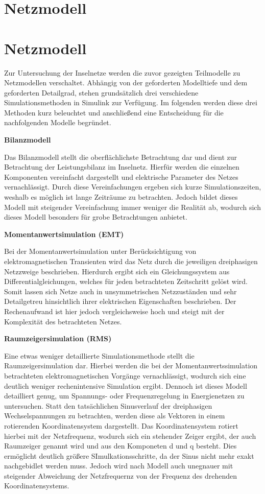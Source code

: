 \section{Netzmodell}
\section{Netzmodell}

Zur Untersuchung der Inselnetze werden die zuvor gezeigten Teilmodelle zu Netzmodellen verschaltet. Abhängig von der geforderten Modelltiefe und dem geforderten Detailgrad, stehen grundsätzlich drei verschiedene Simulationsmethoden in Simulink zur Verfügung. Im folgenden werden diese drei Methoden kurz beleuchtet und anschließend eine Entscheidung für die nachfolgenden Modelle begründet.

\textbf{Bilanzmodell}

Das Bilanzmodell stellt die oberflächlichste Betrachtung dar und dient zur Betrachtung der Leistungsbilanz im Inselnetz. Hierfür werden die einzelnen Komponenten vereinfacht dargestellt und elektrische Parameter des Netzes vernachlässigt. Durch diese Vereinfachungen ergeben sich kurze Simulationszeiten, weshalb es möglich ist lange Zeiträume zu betrachten. Jedoch bildet dieses Modell mit steigender Vereinfachung immer weniger die Realität ab, wodurch sich dieses Modell besonders für grobe Betrachtungen anbietet.

\textbf{Momentanwertsimulation (EMT)}

Bei der Momentanwertsimulation unter Berücksichtigung von elektromagnetischen Transienten wird das Netz durch die jeweiligen dreiphasigen Netzzweige beschrieben. Hierdurch ergibt sich ein Gleichungssystem aus Differentialgleichungen, welches für jeden betrachteten Zeitschritt gelöst wird. Somit lassen sich Netze auch in unsymmetrischen Netzzuständen und sehr Detailgetreu hinsichtlich ihrer elektrischen Eigenschaften beschrieben. Der Rechenaufwand ist hier jedoch vergleichsweise hoch und steigt mit der Komplexität des betrachteten Netzes. \cite{Simulationsmethoden}

\textbf{Raumzeigersimulation (RMS)}

Eine etwas weniger detaillierte Simulationsmethode stellt die Raumzeigersimulation dar. Hierbei werden die bei der Momentanwertssimulation betrachteten elektromagnetischen Vorgänge vernachlässigt, wodurch sich eine deutlich weniger rechenintensive Simulation ergibt. Dennoch ist dieses Modell detailliert genug, um Spannungs- oder Frequenzregelung in Energienetzen zu untersuchen. Statt den tatsächlichen Sinusverlauf der dreiphasigen Wechselspannungen zu betrachten, werden diese als Vektoren in einem rotierenden Koordinatensystem dargestellt. Das Koordinatensystem rotiert hierbei mit der Netzfrequenz, wodurch sich ein stehender Zeiger ergibt, der auch Raumzeiger genannt wird und aus den Komponeten d und q besteht. Dies ermöglicht deutlich größere SImulkationsschritte, da der Sinus nicht mehr exakt nachgebidlet werden muss. Jedoch wird nach Modell auch unegnauer mit steigender Abweichung der Netzfrequernz von der Frequenz des drehenden Koordinatensystems. \cite{Simulationsmethoden}

